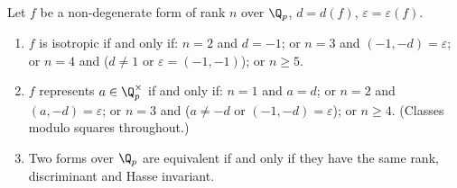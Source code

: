 \begin{theorem}\label{thm:localforms}
Let $f$ be a non-degenerate form of rank $n$ over $\Q_p$, $d=d(f)$, $\varepsilon=\varepsilon(f)$.
\begin{enumerate}[label=(\alph*)]
\item $f$ is isotropic if and only if: $n=2$ and $d=-1$; or $n=3$ and $(-1,-d)=\varepsilon$; or $n=4$ and ($d\ne1$ or
$\varepsilon=(-1,-1)$); or $n\ge5$.
\item $f$ represents $a\in\Q_p^\times$ if and only if: $n=1$ and $a=d$; or $n=2$ and $(a,-d)=\varepsilon$; or $n=3$ and ($a\ne-d$ or
$(-1,-d)=\varepsilon$); or $n\ge4$. (Classes modulo squares throughout.)
\item Two forms over $\Q_p$ are equivalent if and only if they have the same rank, discriminant and Hasse invariant.
\end{enumerate}
\end{theorem}
